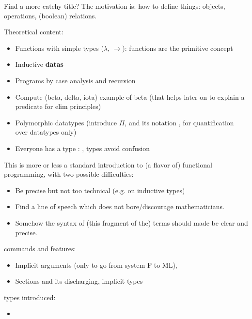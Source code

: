 \label{ch:prog}

Find a more catchy title? The motivation is: how to define things:
objects, operations, (boolean) relations.

Theoretical content:
\begin{itemize}
\item Functions with simple types ($\lambda$, $\rightarrow$): functions are the primitive concept
\item Inductive {\bf datas}
\item Programs by case analysis and recursion
\item Compute (beta, delta, iota) example of beta (that helps later on to explain a predicate for elim principles)
\item Polymorphic datatypes (introduce $\Pi$, and its \Coq{} notation
  , for quantification over datatypes only)
\item Everyone has a type : , types avoid confusion
\end{itemize}
This is more or less a standard introduction to (a flavor of)
functional programming, with two possible difficulties:
\begin{itemize}
\item Be precise but not too technical (e.g. on inductive types)
\item Find a line of speech which does not bore/discourage
  mathematicians.
\item Somehow the syntax of (this fragment of the) terms should made
  be clear and precise.
\end{itemize}

\Coq{} commands and features:
\begin{itemize}
\item Implicit arguments (only to go from system F to ML), 
\item Sections and its discharging, implicit types
\end{itemize}


\Coq{} types introduced:
\begin{itemize}
\item {}
\end{itemize}

